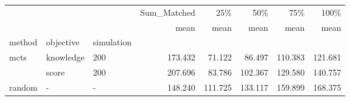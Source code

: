 \begin{tabular}{lllrrrrr}
\toprule
       &   &   & Sum\_Matched &     25\% &     50\% &     75\% &    100\% \\
       &   &   &        mean &    mean &    mean &    mean &    mean \\
method & objective & simulation &             &         &         &         &         \\
\midrule
mcts & knowledge & 200 &     173.432 &  71.122 &  86.497 & 110.383 & 121.681 \\
       & score & 200 &     207.696 &  83.786 & 102.367 & 129.580 & 140.757 \\
random & - & - &     148.240 & 111.725 & 133.117 & 159.899 & 168.375 \\
\bottomrule
\end{tabular}
